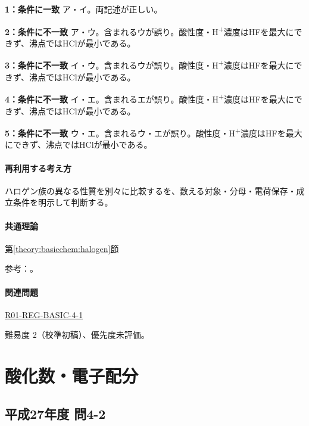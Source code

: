 \noindent\textbf{1：条件に一致} ア・イ。両記述が正しい。\par

\noindent\textbf{2：条件に不一致} ア・ウ。含まれるウが誤り。酸性度・H\textsuperscript{+}濃度はHFを最大にできず、沸点ではHClが最小である。\par

\noindent\textbf{3：条件に不一致} イ・ウ。含まれるウが誤り。酸性度・H\textsuperscript{+}濃度はHFを最大にできず、沸点ではHClが最小である。\par

\noindent\textbf{4：条件に不一致} イ・エ。含まれるエが誤り。酸性度・H\textsuperscript{+}濃度はHFを最大にできず、沸点ではHClが最小である。\par

\noindent\textbf{5：条件に不一致} ウ・エ。含まれるウ・エが誤り。酸性度・H\textsuperscript{+}濃度はHFを最大にできず、沸点ではHClが最小である。\par

\paragraph{再利用する考え方} ハロゲン族の異なる性質を別々に比較するを、数える対象・分母・電荷保存・成立条件を明示して判断する。

\paragraph{共通理論} \hyperref[theory:basicchem:halogen]{第\ref*{theory:basicchem:halogen}節}

\par 参考：\cite{purdue_halogens,rsc_halogen,nist_halogen_properties,msu_hydrogen_bonding,purdue_acid_strength,yale_hydrohalic}。

\paragraph{関連問題} \hyperref[q:r01-reg-basic-4-1]{R01-REG-BASIC-4-1}

\par 難易度 2（校準初稿）、優先度未評価。

\section{酸化数・電子配分}

\subsection{平成27年度 問4-2}
\label{q:h27-reg-basic-4-2}

